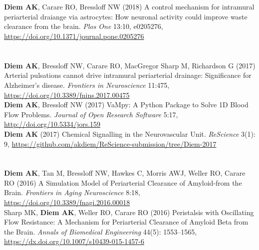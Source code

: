 \documentclass[margin,line,10pt]{res}
\begin{document}
\begin{resume}
\section{}
{\bf Diem AK}, Carare RO, Bressloff NW (2018) A control mechanism for intramural periarterial draiange via astrocytes: How neuronal activity could improve waste clearance from the brain. \textit{Plos One} 13:10, e0205276, \url{https://doi.org/10.1371/journal.pone.0205276}\\
\vspace*{-.35in}
\section{}
{\bf Diem AK}, Bressloff NW, Carare RO, MacGregor Sharp M, Richardson G (2017) Arterial pulsations cannot drive intramural periarterial drainage: Significance for Alzheimer's disease. \textit{Frontiers in Neuroscience} 11:475, \url{https://doi.org/10.3389/fnins.2017.00475}\\
{\bf Diem AK}, Bressloff NW (2017) VaMpy: A Python Package to Solve 1D Blood Flow Problems. {\em Journal of Open Research Software} 5:17, \url{http://doi.org/10.5334/jors.159}\\
{\bf Diem AK} (2017) Chemical Signalling in the Neurovascular Unit. \textit{ReScience} 3(1): 9, \url{https://github.com/akdiem/ReScience-submission/tree/Diem-2017}\\
\vspace*{-.35in}
\section{}
{\bf Diem AK}, Tan M, Bressloff NW, Hawkes C, Morris AWJ, Weller RO, Carare RO (2016) A Simulation Model of Periarterial Clearance of Amyloid-\textbeta from the Brain. \textit{Frontiers in Aging Neuroscience} 8:18, \url{https://doi.org/10.3389/fnagi.2016.00018}\\
Sharp MK, {\bf Diem AK}, Weller RO, Carare RO (2016) Peristalsis with Oscillating Flow Resistance: A Mechanism for Periarterial Clearance of Amyloid Beta from the Brain. \textit{Annals of Biomedical Engineering} 44(5): 1553--1565, \url{https://dx.doi.org/10.1007/s10439-015-1457-6}\\

\end{resume}
\end{document}
